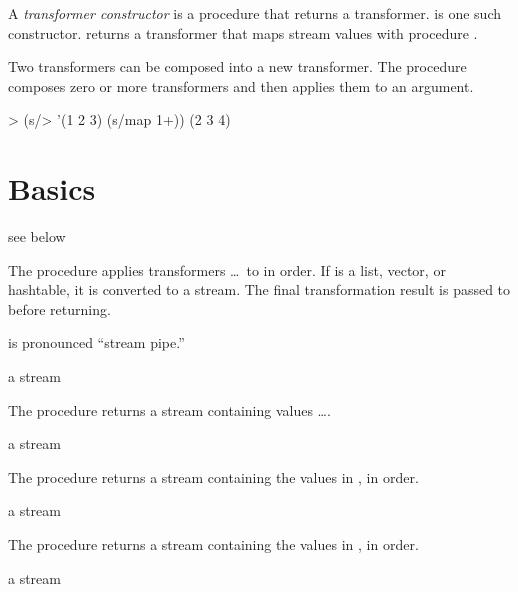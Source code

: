 A \emph{transformer constructor} is a procedure that returns a transformer. 
is one such constructor.  returns a transformer that maps stream values
with procedure .

Two transformers can be composed into a new transformer. The  procedure composes
zero or more transformers and then applies them to an argument.

\codebegin
> (s/> '(1 2 3) (s/map 1+))
(2 3 4)
\codeend

\section {Basics}

\begin{procedure}
\end{procedure}
\returns{} see below

The  procedure applies transformers  \ldots\ to  in order. If
 is a list, vector, or hashtable, it is converted to a stream. The final
transformation result is passed to  before returning.

 is pronounced ``stream pipe.''

\begin{procedure}
\end{procedure}
\returns{} a stream

The  procedure returns a stream containing values  \ldots.

\begin{procedure}
\end{procedure}
\returns{} a stream

The  procedure returns a stream containing the values in , in
order.

\begin{procedure}
\end{procedure}
\returns{} a stream

The  procedure returns a stream containing the values in
, in order.

\begin{procedure}
\end{procedure}
\returns{} a stream


